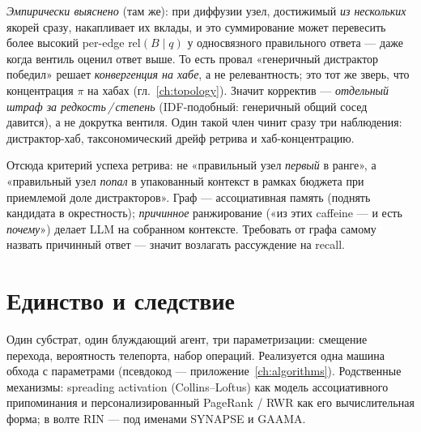 \begin{principle}
\emph{Эмпирически выяснено} (там же): при диффузии узел, достижимый \emph{из нескольких}
якорей сразу, накапливает их вклады, и это суммирование может перевесить более высокий
per-edge $\text{rel}(B\mid q)$ у односвязного правильного ответа — даже когда вентиль
оценил ответ выше. То есть провал «генеричный дистрактор победил» решает \emph{конвергенция
на хабе}, а не релевантность; это тот же зверь, что концентрация $\pi$ на хабах
(гл.~\ref{ch:topology}). Значит корректив — \emph{отдельный штраф за редкость\,/\,степень}
(IDF-подобный: генеричный общий сосед давится), а не докрутка вентиля. Один такой член
чинит сразу три наблюдения: дистрактор-хаб, таксономический дрейф ретрива и хаб-концентрацию.
\end{principle}

\begin{principle}
Отсюда критерий успеха ретрива: не «правильный узел \emph{первый} в ранге», а «правильный
узел \emph{попал} в упакованный контекст в рамках бюджета при приемлемой доле дистракторов».
Граф — ассоциативная память (поднять кандидата в окрестность); \emph{причинное}
ранжирование («из этих caffeine — и есть \emph{почему}») делает LLM на собранном контексте.
Требовать от графа самому назвать причинный ответ — значит возлагать рассуждение на recall.
\end{principle}

\section{Единство и следствие}

Один субстрат, один блуждающий агент, три параметризации: смещение перехода,
вероятность телепорта, набор операций. Реализуется одна машина обхода с параметрами
(псевдокод — приложение~\ref{ch:algorithms}). Родственные механизмы: spreading
activation (Collins–Loftus) как модель ассоциативного припоминания и
персонализированный PageRank / RWR как его вычислительная форма; в волте RIN — под
именами SYNAPSE и GAAMA.
